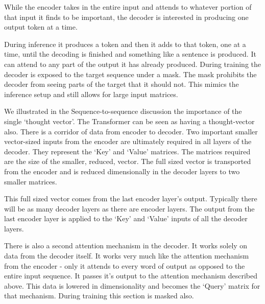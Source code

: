 While the encoder takes in the entire input and attends to whatever portion of that input it finds to be important, the decoder is interested in producing one output token at a time. 

During inference it produces a token and then it adds to that token, one at a time, until the decoding is finished and something like a sentence is produced. It can attend to any part of the output it has already produced. During training the decoder is exposed to the target sequence under a mask. The mask prohibits the decoder from seeing parts of the target that it should not. This mimics the inference setup and still allows for large input matrices.

We illustrated in the Sequence-to-sequence discussion the importance of the single `thought vector'. The Transformer can be seen as having a thought-vector also. There is a corridor of data from encoder to decoder. Two important smaller vector-sized inputs from the encoder are ultimately required in all layers of the decoder. They represent the `Key' and `Value' matrices. The matrices required are the size of the smaller, reduced, vector. The full sized vector is transported from the encoder and is reduced dimensionally in the decoder layers to two smaller matrices. 

This full sized vector comes from the last encoder layer's output. Typically there will be as many decoder layers as there are encoder layers. The output from the last encoder layer is applied to the `Key' and `Value' inputs of all the decoder layers.

There is also a second attention mechanism in the decoder. It works solely on data from the decoder itself. It works very much like the attention mechanism from the encoder - only it attends to every word of output as opposed to the entire input sequence. It passes it's output to the attention mechanism described above. This data is lowered in dimensionality and becomes the `Query' matrix for that mechanism. During training this section is masked also.

